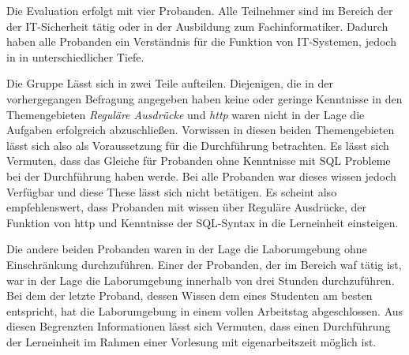 Die Evaluation erfolgt mit vier Probanden.
Alle Teilnehmer sind im Bereich der der IT-Sicherheit tätig oder in der Ausbildung zum Fachinformatiker.
Dadurch haben alle Probanden ein Verständnis für die Funktion von IT-Systemen, jedoch in in unterschiedlicher Tiefe.

Die Gruppe Lässt sich in zwei Teile aufteilen.
Diejenigen, die in der vorhergegangen Befragung angegeben haben keine oder geringe Kenntnisse in den Themengebieten \textit{Reguläre Ausdrücke} und \textit{\ac{http}} waren nicht in der Lage die Aufgaben erfolgreich abzuschließen.
Vorwissen in diesen beiden Themengebieten lässt sich also als Voraussetzung für die Durchführung betrachten.
Es lässt sich Vermuten, dass das Gleiche für Probanden ohne Kenntnisse mit SQL Probleme bei der Durchführung haben werde.
Bei alle Probanden war dieses wissen jedoch Verfügbar und diese These lässt sich nicht betätigen.
Es scheint also empfehlenswert, dass Probanden mit wissen über Reguläre Ausdrücke, der Funktion von \ac{http} und Kenntnisse der SQL-Syntax in die Lerneinheit einsteigen.

Die andere beiden Probanden waren in der Lage die Laborumgebung ohne Einschränkung durchzuführen.
Einer der Probanden, der im Bereich \ac{waf} tätig ist, war in der Lage die Laborumgebung innerhalb von drei Stunden durchzuführen.
Bei dem der letzte Proband, dessen Wissen dem eines Studenten am besten entspricht, hat die Laborumgebung in einem vollen Arbeitstag abgeschlossen.
Aus diesen Begrenzten Informationen lässt sich Vermuten, dass einen Durchführung der Lerneinheit im Rahmen einer Vorlesung mit eigenarbeitszeit möglich ist.

